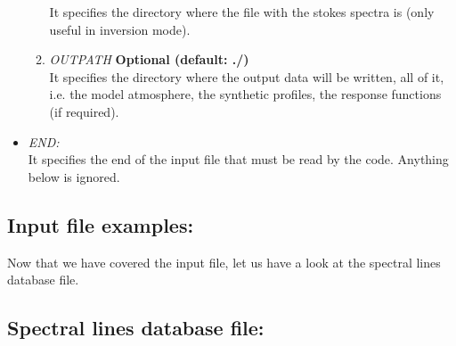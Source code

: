 \begin{itemize}
\begin{enumerate}
    It specifies the directory where the file with the stokes spectra is (only useful in inversion mode).
    \item {\it OUTPATH} {\bf Optional (default: ./)}\\
    It specifies the directory where the output data will be written, all of it, i.e. the model atmosphere, the synthetic profiles, the response functions (if required).
  \end{enumerate}
  \item {\it END:}\\
  It specifies the end of the input file that must be read by the code. Anything below is ignored.
\end{itemize}
%
\subsection{Input file examples:}

%
Now that we have covered the input file, let us have a look at the spectral lines database file.\\
\subsection{Spectral lines database file:}

%


